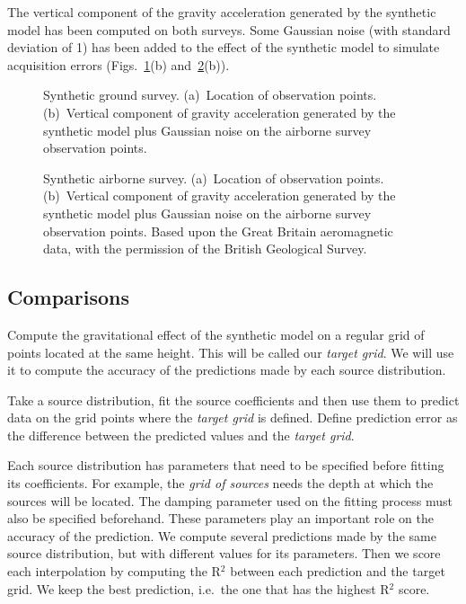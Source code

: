 \documentclass[twocolumn]{article}
\begin{document}
The vertical component of the gravity acceleration generated by the synthetic
model has been computed on both surveys.
Some Gaussian noise (with standard deviation of \SI{1}{\mgal}) has been added
to the effect of the synthetic model to simulate acquisition errors
(Figs.~\ref{fig:synthetic-ground-survey}(b)
and~\ref{fig:synthetic-airborne-survey}(b)).

\begin{figure}
    \caption{
        Synthetic ground survey.
        (a)~Location of observation points.
        (b)~Vertical component of gravity acceleration generated by the
            synthetic model plus Gaussian noise on the airborne survey
            observation points.
    }
    \label{fig:synthetic-ground-survey}
\end{figure}

\begin{figure}
    \caption{
        Synthetic airborne survey.
        (a)~Location of observation points.
        (b)~Vertical component of gravity acceleration generated by the
            synthetic model plus Gaussian noise on the airborne survey
            observation points.
        Based upon the Great Britain aeromagnetic data, with the permission of
        the British Geological Survey.
    }
    \label{fig:synthetic-airborne-survey}
\end{figure}

\subsection{Comparisons}


Compute the gravitational effect of the synthetic model on a regular grid of
points located at the same height.
This will be called our \emph{target grid}.
We will use it to compute the accuracy of the predictions made by each source
distribution.

Take a source distribution, fit the source coefficients and then use them to
predict data on the grid points where the \emph{target grid} is defined.
Define prediction error as the difference between the predicted values and the
\emph{target grid}.

Each source distribution has parameters that need to be specified before
fitting its coefficients.
For example, the \emph{grid of sources} needs the depth at which the sources
will be located.
The damping parameter used on the fitting process must also be specified
beforehand.
These parameters play an important role on the accuracy of the prediction.
We compute several predictions made by the same source distribution, but with
different values for its parameters.
Then we score each interpolation by computing the R$^2$ between each prediction
and the target grid.
We keep the best prediction, i.e.\ the one that has the highest R$^2$ score.
\end{document}
